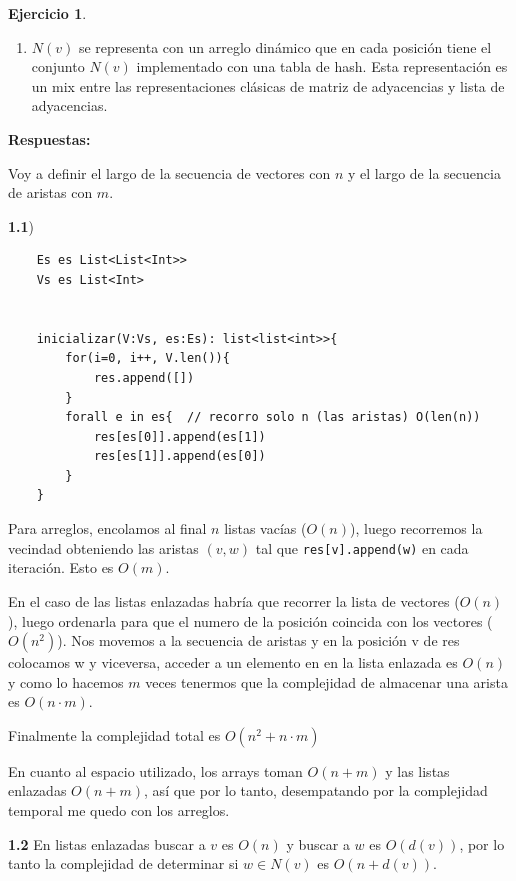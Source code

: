 \documentclass[12pt]{article}
\theoremstyle{definition}
\newtheorem{ejercicio}{Ejercicio}
\begin{document}
\begin{ejercicio}
\begin{enumerate}
        booleanos $A_i$ con $|V (G)|$ posiciones tal que $A_i[j]$ es verdadero si y solo si $i$ es adyacente 
        a $j$. Esta representación se conoce comúnmente como matriz de adyacencias.
        \item $N (v)$ se representa con un arreglo dinámico que en cada posición tiene el conjunto $N (v)$ 
        implementado con una tabla de hash. Esta representación es un mix entre las representaciones clásicas 
        de matriz de adyacencias y lista de adyacencias.
    \end{enumerate}
\end{ejercicio}

\textbf{Respuestas:}

Voy a definir el largo de la secuencia de vectores con $n$ y el largo de la secuencia de aristas con $m$.

\textbf{1.1}) 
\begin{verbatim}
    Es es List<List<Int>>
    Vs es List<Int>


    inicializar(V:Vs, es:Es): list<list<int>>{
        for(i=0, i++, V.len()){
            res.append([])
        }
        forall e in es{  // recorro solo n (las aristas) O(len(n))
            res[es[0]].append(es[1])
            res[es[1]].append(es[0]) 
        }
    }
\end{verbatim}

Para arreglos, encolamos al final $n$ listas vacías ($O(n)$), luego recorremos la vecindad obteniendo las 
aristas $(v,w)$ tal que \lstinline|res[v].append(w)| en cada iteración. Esto es $O(m)$.

En el caso de las listas enlazadas habría que recorrer la lista de vectores ($O(n)$), luego ordenarla para
que el numero de la posición coincida con los vectores ($O(n^2)$). Nos movemos a la secuencia de aristas y 
en la posición v de res colocamos w y viceversa, acceder a un elemento en en la lista enlazada es $O(n)$ y 
como lo hacemos $m$ veces tenermos que la complejidad de almacenar una arista es $O(n \cdot m)$.

Finalmente la complejidad total es $O(n^2 + n \cdot m)$

En cuanto al espacio utilizado, los arrays toman $O(n+m)$ y las listas enlazadas $O(n + m)$, así que por lo
tanto, desempatando por la complejidad temporal me quedo con los arreglos.

\textbf{1.2}
En listas enlazadas buscar a $v$ es $O(n)$ y buscar a $w$ es $O(d(v))$, por lo tanto la complejidad de 
determinar si $w \in N(v)$ es $O(n + d(v))$.
\end{document}
